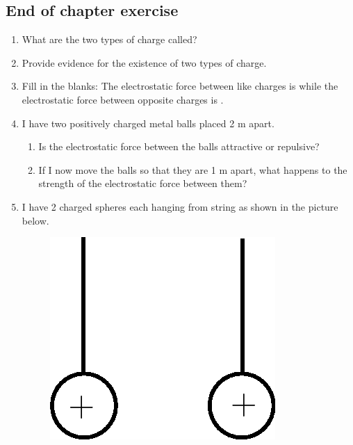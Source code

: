             \subsection{ End of chapter exercise}
            \nopagebreak
      \label{m38781*id202059}\begin{enumerate}[noitemsep, label=\textbf{\arabic*}. ] 
            \label{m38781*uid21}\item What are the two types of charge called?\newline
\label{m38781*uid22}\item Provide evidence for the existence of two types of charge.\newline
\label{m38781*uid23}\item Fill in the blanks: The electrostatic force between like charges is  \uline{\hspace{10ex}}
 while the electrostatic force between opposite charges is  \uline{\hspace{10ex}}
.\newline
\label{m38781*uid24}\item I have two positively charged metal balls placed 2 m apart.
\label{m38781*id202122}\begin{enumerate}[noitemsep, label=\textbf{\alph*}. ] 
            \label{m38781*uid25}\item Is the electrostatic force between the balls attractive or repulsive?
\label{m38781*uid26}\item If I now move the balls so that they are 1 m apart, what happens to the strength of the electrostatic force between them?
\end{enumerate}
        \newline
            \label{m38781*uid27}\item I have 2 charged spheres each hanging from string as shown in the picture below.
    \setcounter{subfigure}{0}
	\begin{figure}[H] %
    \begin{center}
    \label{m38781*id202166!!!underscore!!!media}\label{m38781*id202166!!!underscore!!!printimage}\includegraphics[width=0.3\columnwidth]{col11305.imgs/m38781_PG10C8_012.png} %

\end{center}
\end{figure}
\end{enumerate}
